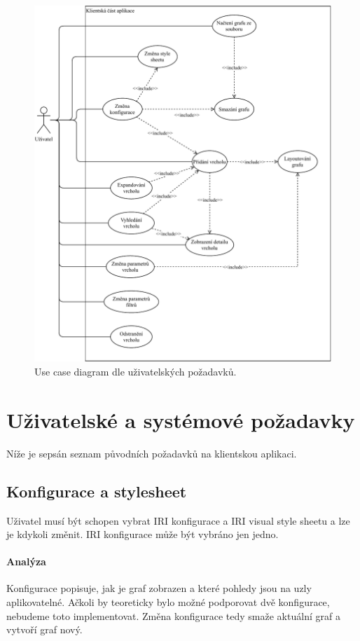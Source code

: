 \begin{figure}
    \centering
    \includegraphics[width=\textwidth]{media/use-case.pdf}
    \caption{Use case diagram dle uživatelských požadavků.}
    \label{fig:use-case}
\end{figure}

\section{Uživatelské a systémové požadavky}

Níže je sepsán seznam původních požadavků na klientskou aplikaci.

\subsection*{Konfigurace a stylesheet}
Uživatel musí být schopen vybrat IRI konfigurace a IRI visual style sheetu a lze je kdykoli změnit. IRI konfigurace může být vybráno jen jedno.

\paragraph{Analýza} Konfigurace popisuje, jak je graf zobrazen a které pohledy jsou na uzly aplikovatelné. Ačkoli by teoreticky bylo možné podporovat dvě konfigurace, nebudeme toto implementovat. Změna konfigurace tedy smaže aktuální graf a vytvoří graf nový.

